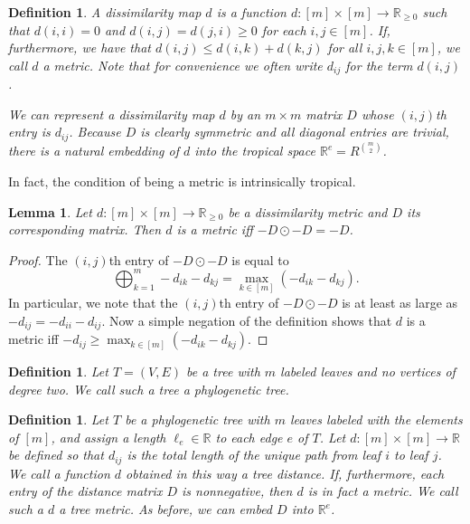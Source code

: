 \documentclass[12pt]{extarticle}
\numberwithin{theorem}{section}
\newtheorem{lemma}[theorem]{Lemma}
\newtheorem{definition}[theorem]{Definition}
\begin{document}
\begin{definition}
A \emph{dissimilarity map} $d$ is a function $d:[m]\times [m]\to \mathbb R_{\geq 0}$ such that $d(i,i)=0$ and $d(i,j)=d(j,i)\geq 0$ for each $i,j\in [m]$. If, furthermore, we have that $d(i,j)\leq d(i,k)+d(k,j)$ for all $i,j,k\in [m]$, we call $d$ a \emph{metric}. Note that for convenience we often write $d_{ij}$ for the term $d(i,j)$.

We can represent a dissimilarity map $d$ by an $m\times m$ matrix $D$ whose $(i,j)$th entry is $d_{ij}$. Because $D$ is clearly symmetric and all diagonal entries are trivial, there is a natural embedding of $d$ into the tropical space $\mathbb R^{e} = R^{\binom m 2}$.
\end{definition}

In fact, the condition of being a metric is intrinsically tropical.

\begin{lemma}
\label{metric-condition}
Let $d:[m]\times [m]\to\mathbb R_{\geq 0}$ be a dissimilarity metric and $D$ its corresponding matrix. Then $d$ is a metric iff $-D\odot -D = -D$.
\end{lemma}
\begin{proof}
The $(i,j)$th entry of $-D\odot -D$ is equal to 
\[\bigoplus_{k=1}^m -d_{ik}-d_{kj} = \max_{k\in [m]}(-d_{ik}-d_{kj}).\]
In particular, we note that the $(i,j)$th entry of $-D\odot -D$ is at least as large as $-d_{ij}=-d_{ii}-d_{ij}$. Now a simple negation of the definition shows that $d$ is a metric iff $-d_{ij}\geq \max_{k\in [m]}(-d_{ik}-d_{kj})$. 
\end{proof}

\begin{definition}
Let $T=(V,E)$ be a tree with $m$ labeled leaves and no vertices of degree two. We call such a tree a \emph{phylogenetic tree}.
\end{definition}

\begin{definition}
Let $T$ be a phylogenetic tree with $m$ leaves labeled with the elements of $[m]$, and assign a length $\ell_e\in \mathbb R$ to each edge $e$ of $T$. Let $d:[m]\times [m]\to \mathbb R$ be defined so that $d_{ij}$ is the total length of the unique path from leaf $i$ to leaf $j$. We call a function $d$ obtained in this way a \emph{tree distance}. If, furthermore, each entry of the distance matrix $D$ is nonnegative, then $d$ is in fact a metric. We call such a $d$ a \emph{tree metric}. As before, we can embed $D$ into $\mathbb R^{e}$. 
\end{definition}
\end{document}

